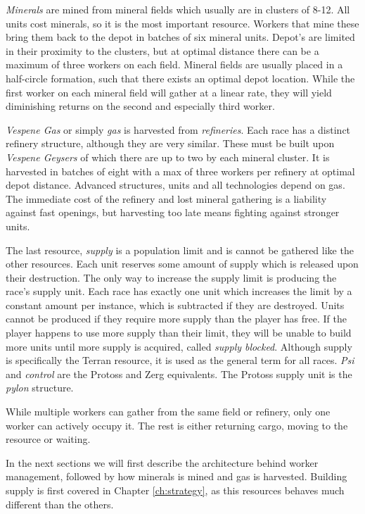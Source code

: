\emph{Minerals} are mined from mineral fields which usually are in clusters of 8-12. All units cost minerals, so it is the most important resource. Workers that mine these bring them back to the depot in batches of six mineral units. Depot's are limited in their proximity to the clusters, but at optimal distance there can be a maximum of three workers on each field. Mineral fields are usually placed in a half-circle formation, such that there exists an optimal depot location. While the first worker on each mineral field will gather at a linear rate, they will yield diminishing returns on the second and especially third worker.

\emph{Vespene Gas} or simply \emph{gas} is harvested from \emph{refineries}. Each race has a distinct refinery structure, although they are very similar. These must be built upon \emph{Vespene Geysers} of which there are up to two by each mineral cluster. It is harvested in batches of eight with a max of three workers per refinery at optimal depot distance. Advanced structures, units and all technologies depend on gas. The immediate cost of the refinery and lost mineral gathering is a liability against fast openings, but harvesting too late means fighting against stronger units.

The last resource, \emph{supply} is a population limit and is cannot be gathered like the other resources. Each unit reserves some amount of supply which is released upon their destruction. The only way to increase the supply limit is producing the race's supply unit. Each race has exactly one unit which increases the limit by a constant amount per instance, which is subtracted if they are destroyed. Units cannot be produced if they require more supply than the player has free. If the player happens to use more supply than their limit, they will be unable to build more units until more supply is acquired, called \emph{supply blocked}. Although supply is specifically the Terran resource, it is used as the general term for all races. \emph{Psi} and \emph{control} are the Protoss and Zerg equivalents. The Protoss supply unit is the \emph{pylon} structure.

While multiple workers can gather from the same field or refinery, only one worker can actively occupy it. The rest is either returning cargo, moving to the resource or waiting.

In the next sections we will first describe the architecture behind worker management, followed by how minerals is mined and gas is harvested. Building supply is first covered in Chapter \ref{ch:strategy}, as this resources behaves much different than the others.

